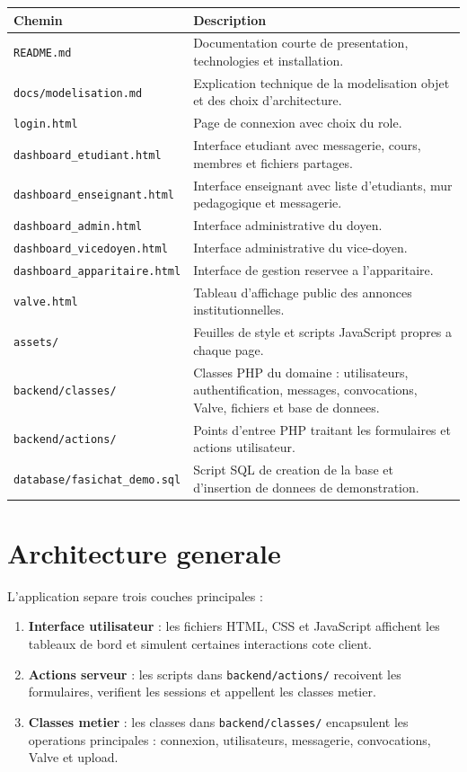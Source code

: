 \documentclass[12pt,a4paper]{article}
\begin{document}
\begin{longtable}{|p{5cm}|p{9cm}|}
\hline
\textbf{Chemin} & \textbf{Description} \\
\hline
\texttt{README.md} & Documentation courte de presentation, technologies et installation. \\
\hline
\texttt{docs/modelisation.md} & Explication technique de la modelisation objet et des choix d'architecture. \\
\hline
\texttt{login.html} & Page de connexion avec choix du role. \\
\hline
\texttt{dashboard\_etudiant.html} & Interface etudiant avec messagerie, cours, membres et fichiers partages. \\
\hline
\texttt{dashboard\_enseignant.html} & Interface enseignant avec liste d'etudiants, mur pedagogique et messagerie. \\
\hline
\texttt{dashboard\_admin.html} & Interface administrative du doyen. \\
\hline
\texttt{dashboard\_vicedoyen.html} & Interface administrative du vice-doyen. \\
\hline
\texttt{dashboard\_apparitaire.html} & Interface de gestion reservee a l'apparitaire. \\
\hline
\texttt{valve.html} & Tableau d'affichage public des annonces institutionnelles. \\
\hline
\texttt{assets/} & Feuilles de style et scripts JavaScript propres a chaque page. \\
\hline
\texttt{backend/classes/} & Classes PHP du domaine : utilisateurs, authentification, messages, convocations, Valve, fichiers et base de donnees. \\
\hline
\texttt{backend/actions/} & Points d'entree PHP traitant les formulaires et actions utilisateur. \\
\hline
\texttt{database/fasichat\_demo.sql} & Script SQL de creation de la base et d'insertion de donnees de demonstration. \\
\hline
\end{longtable}

\section{Architecture generale}

L'application separe trois couches principales :

\begin{enumerate}
    \item \textbf{Interface utilisateur} : les fichiers HTML, CSS et JavaScript affichent les tableaux de bord et simulent certaines interactions cote client.
    \item \textbf{Actions serveur} : les scripts dans \texttt{backend/actions/} recoivent les formulaires, verifient les sessions et appellent les classes metier.
    \item \textbf{Classes metier} : les classes dans \texttt{backend/classes/} encapsulent les operations principales : connexion, utilisateurs, messagerie, convocations, Valve et upload.
\end{enumerate}
\end{document}
